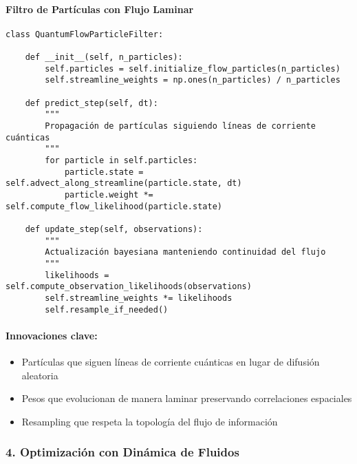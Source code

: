 \documentclass{book}
\begin{document}
\paragraph*{Filtro de Partículas con Flujo Laminar}
\begin{verbatim}
class QuantumFlowParticleFilter:

    def __init__(self, n_particles):
        self.particles = self.initialize_flow_particles(n_particles)
        self.streamline_weights = np.ones(n_particles) / n_particles

    def predict_step(self, dt):
        """
        Propagación de partículas siguiendo líneas de corriente cuánticas
        """
        for particle in self.particles:
            particle.state = self.advect_along_streamline(particle.state, dt)
            particle.weight *= self.compute_flow_likelihood(particle.state)

    def update_step(self, observations):
        """
        Actualización bayesiana manteniendo continuidad del flujo
        """
        likelihoods = self.compute_observation_likelihoods(observations)
        self.streamline_weights *= likelihoods
        self.resample_if_needed()
\end{verbatim}
\paragraph*{Innovaciones clave:}
\begin{itemize}
    \item Partículas que siguen líneas de corriente cuánticas en lugar de difusión aleatoria
    \item Pesos que evolucionan de manera laminar preservando correlaciones espaciales
    \item Resampling que respeta la topología del flujo de información
\end{itemize}
\subsubsection*{4. Optimización con Dinámica de Fluidos}
\end{document}
